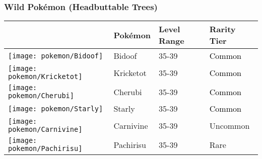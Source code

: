 \subsubsection{Wild Pokémon (Headbuttable Trees)}%
\label{ssubsec:WildPokmon(HeadbuttableTrees)}%
\begin{longtable}{||l l l l||}%
\hline%
\rowcolor{GroundColor}%
&Pokémon&Level Range&Rarity Tier\\%
\hline%
\endhead%
\hline%
\rowcolor{GroundColor}%
\texttt{[image: pokemon/Bidoof]}&Bidoof&35{-}39&\textcolor{black}{%
Common%
}\\%
\hline%
\rowcolor{GroundColor}%
\texttt{[image: pokemon/Kricketot]}&Kricketot&35{-}39&\textcolor{black}{%
Common%
}\\%
\hline%
\rowcolor{GroundColor}%
\texttt{[image: pokemon/Cherubi]}&Cherubi&35{-}39&\textcolor{black}{%
Common%
}\\%
\hline%
\rowcolor{GroundColor}%
\texttt{[image: pokemon/Starly]}&Starly&35{-}39&\textcolor{black}{%
Common%
}\\%
\hline%
\rowcolor{GroundColor}%
\texttt{[image: pokemon/Carnivine]}&Carnivine&35{-}39&\textcolor{OliveGreen}{%
Uncommon%
}\\%
\hline%
\rowcolor{GroundColor}%
\texttt{[image: pokemon/Pachirisu]}&Pachirisu&35{-}39&\textcolor{RedOrange}{%
Rare%
}\\%
\hline%
\end{longtable}%
\caption{Wild Pokemon in Lake Valor (Headbuttable Trees)}